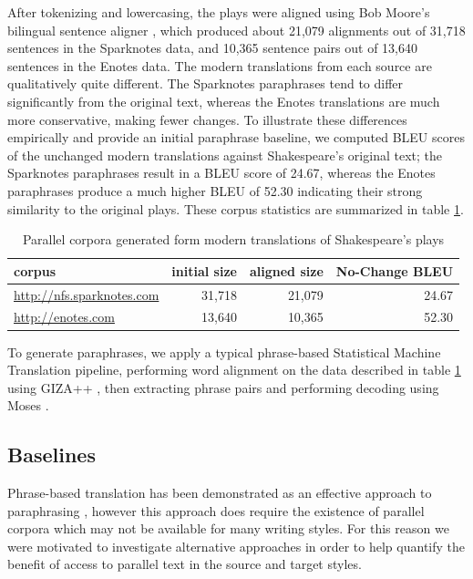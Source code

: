 \documentclass[10pt,a5paper,twoside]{article}
\begin{document}
After tokenizing and lowercasing, the plays were aligned using Bob Moore's bilingual sentence aligner \cite{Moore02}, which produced about 21,079 alignments out of 31,718 sentences in the Sparknotes data, and 10,365 sentence pairs out of 13,640 sentences in the Enotes data.  The modern translations from each source are qualitatively quite
different.  The Sparknotes paraphrases tend to differ significantly from the original text, whereas the Enotes translations are much more conservative, making fewer changes.
To illustrate these differences empirically and provide an initial paraphrase baseline, we computed BLEU scores of the unchanged modern translations against Shakespeare's 
original text; the Sparknotes paraphrases result in a BLEU score of 24.67, whereas the Enotes paraphrases produce a much higher BLEU of 52.30 indicating their strong similarity to the original plays.
These corpus statistics are summarized in table \ref{corpus_stats}.

\begin{table}
  \begin{center}
    \begin{tabular}{|l|r|r|r|}
      \hline
      corpus & initial size & aligned size & No-Change BLEU\\
      \hline
      \hline
      \url{http://nfs.sparknotes.com} & 31,718 & 21,079 & 24.67 \\
      \hline
      \url{http://enotes.com} & 13,640 & 10,365 & 52.30 \\
      \hline
    \end{tabular}
  \end{center}
  \caption{Parallel corpora generated form modern translations of Shakespeare's plays}
  \label{corpus_stats}
\end{table}

To generate paraphrases, we apply a typical phrase-based Statistical Machine Translation pipeline, performing
word alignment on the data described in table \ref{corpus_stats} using GIZA++ \cite{Och03}, then extracting phrase pairs and performing decoding using Moses \cite{Koehn07}.

\subsection{Baselines}
Phrase-based translation has been demonstrated as an effective approach to paraphrasing \cite{chen11,quirk04}, however this approach does require the existence of
parallel corpora which may not be available for many writing styles.  For this reason we were motivated to investigate alternative approaches in order to help
quantify the benefit of access to parallel text in the source and target styles.
\end{document}
